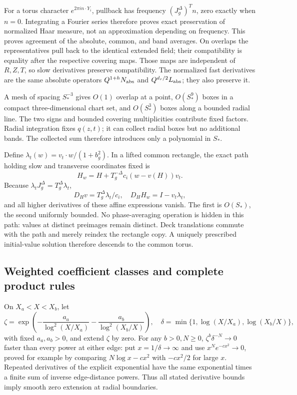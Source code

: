 \documentclass[10pt,a4paper]{article}
\begin{document}
For a torus character \(e^{2\pi i n\cdot Y_i}\), pullback has frequency \((J_g^\Delta)^Tn\), zero exactly when \(n=0\). Integrating a Fourier series therefore proves exact preservation of normalized Haar measure, not an approximation depending on frequency. This proves agreement of the absolute, common, and band averages. On overlaps the representatives pull back to the identical extended field; their compatibility is equality after the respective covering maps. Those maps are independent of \(R,Z,T\), so slow derivatives preserve compatibility. The normalized fast derivatives are the same absolute operators \(Q^{1+h}N_{\rm abs}\) and \(Q^{d_r/2}L_{\rm abs}\); they also preserve it.

A mesh of spacing \(S_*^{-3}\) gives \(O(1)\) overlap at a point, \(O(S_*^9)\) boxes in a compact three-dimensional chart set, and \(O(S_*^3)\) boxes along a bounded radial line. The two signs and bounded covering multiplicities contribute fixed factors. Radial integration fixes \(q(z,t)\); it can collect radial boxes but no additional bands. The collected sum therefore introduces only a polynomial in \(S_*\).

Define \(\lambda_t(w)=v_t\cdot w/(1+b_g^2)\). In a lifted common rectangle, the exact path holding slow and transverse coordinates fixed is \[
H_w=H+T_g^{-\Delta}c_i(w-v(H))v_t.
\] Because \(\lambda_tJ_g^\Delta=T_g^\Delta\lambda_t\), \[
D_Hv=T_g^\Delta\lambda_t/c_i,\quad
D_HH_w=I-v_t\lambda_t,
\] and all higher derivatives of these affine expressions vanish. The first is \(O(S_*)\), the second uniformly bounded. No phase-averaging operation is hidden in this path: values at distinct preimages remain distinct. Deck translations commute with the path and merely reindex the rectangle copy. A uniquely prescribed initial-value solution therefore descends to the common torus.

\subsection{Weighted coefficient classes and complete product rules}\label{weighted-coefficient-classes-and-complete-product-rules}

On \(X_a<X<X_b\), let \[
\zeta=\exp\left(-\frac{a_a}{\log^2(X/X_a)}-\frac{a_b}{\log^2(X_b/X)}\right),
\quad\delta=\min\{1,\log(X/X_a),\log(X_b/X)\},
\] with fixed \(a_a,a_b>0\), and extend \(\zeta\) by zero. For any \(b>0,N\ge0\), \(\zeta^b\delta^{-N}\to0\) faster than every power at either edge: put \(x=1/\delta\to\infty\) and use \(x^Ne^{-cx^2}\to0\), proved for example by comparing \(N\log x-cx^2\) with \(-cx^2/2\) for large \(x\). Repeated derivatives of the explicit exponential have the same exponential times a finite sum of inverse edge-distance powers. Thus all stated derivative bounds imply smooth zero extension at radial boundaries.
\end{document}
